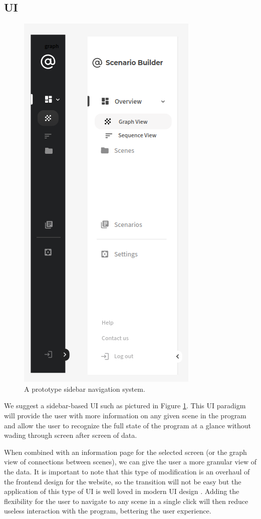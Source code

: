 \documentclass[sigconf]{acmart}
\begin{document}
\subsection{UI}
\begin{figure}
  \begin{center}
  \includegraphics[scale=0.5]{media/sidebar.png}
  \end{center}
\caption{A prototype sidebar navigation system.}\label{fig1}
\end{figure}
We suggest a sidebar-based UI such as pictured in Figure \ref{fig1}. This UI paradigm will provide the user with more information on any given scene in the program and allow the user to recognize the full state of the program at a glance without wading through screen after screen of data.

When combined with an information page for the selected screen (or the graph view of connections between scenes), we can give the user a more granular view of the data. It is important to note that this type of modification is an overhaul of the frontend design for the website, so the transition will not be easy but the application of this type of UI is well loved in modern UI design \cite{YourConnectedWorkspace} \cite{SupabaseOpenSource} \cite{FlutterBuildApps}. Adding the flexibility for the user to navigate to any scene in a single click will then reduce useless interaction with the program, bettering the user experience.
\end{document}
